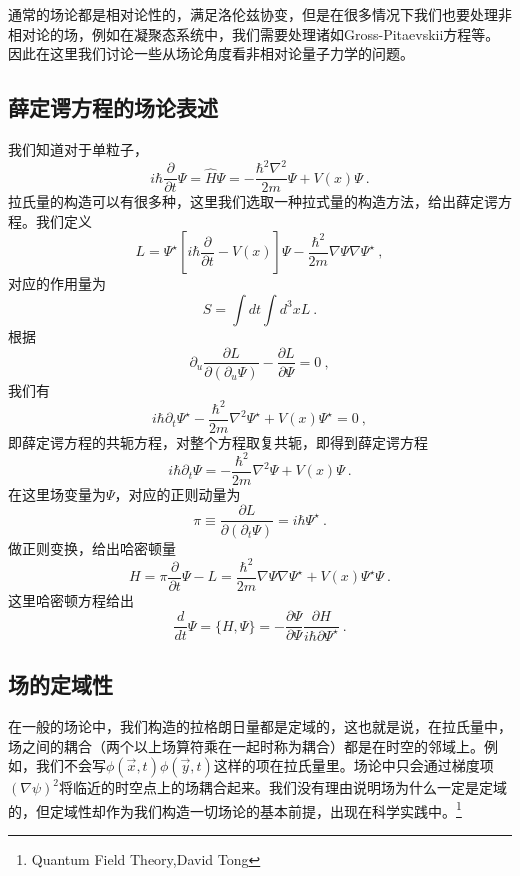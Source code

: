 
\begin{issues}
\issueDraft
\end{issues}

通常的场论都是相对论性的，满足洛伦兹协变，但是在很多情况下我们也要处理非相对论的场，例如在凝聚态系统中，我们需要处理诸如Gross-Pitaevskii方程等。因此在这里我们讨论一些从场论角度看非相对论量子力学的问题。
\subsection{薛定谔方程的场论表述}
我们知道对于单粒子，
\begin{equation}
i\hbar \frac{\partial}{\partial t} \Psi = \hat{H} \Psi = -\frac{\hbar^2 \nabla^2}{2m} \Psi + V(x)\Psi ~.
\end{equation}
拉氏量的构造可以有很多种，这里我们选取一种拉式量的构造方法，给出薛定谔方程。我们定义
$$
L =  \Psi^\star [i\hbar \frac{\partial}{\partial t}  - V(x)]\Psi - \frac{\hbar^2}{2m}\nabla \Psi \nabla \Psi^\star~,
$$
对应的作用量为
$$
S = \int dt \int d^3 x L~.
$$
根据
$$
\partial_u \frac{\partial L}{\partial (\partial_u \Psi)} - \frac{\partial L}{\partial \Psi}=0 ~,
$$
我们有
$$
i\hbar \partial_t \Psi^\star - \frac{\hbar^2}{2m}\nabla^2 \Psi^\star + V(x)\Psi^\star=0 ~,
$$
即薛定谔方程的共轭方程，对整个方程取复共轭，即得到薛定谔方程
$$
i\hbar \partial_t \Psi = -\frac{\hbar^2}{2m}\nabla^2 \Psi + V(x)\Psi ~.
$$
在这里场变量为$\Psi$，对应的正则动量为
$$
\pi \equiv \frac{\partial L}{\partial (\partial_t \Psi)} = i\hbar \Psi^\star~.
$$
做正则变换，给出哈密顿量
$$
H = \pi \frac{\partial}{\partial t}\Psi - L =  \frac{\hbar^2}{2m} \nabla\Psi \nabla \Psi^\star+ V(x)\Psi^\star\Psi~.
$$
这里哈密顿方程给出
$$
\frac{d}{d t}\Psi = \{H,\Psi\} = -\frac{\partial \Psi}{\partial \Psi}\frac{\partial H}{i\hbar \partial \Psi^\star}~.
$$
\subsection{场的定域性}
在一般的场论中，我们构造的拉格朗日量都是定域的，这也就是说，在拉氏量中，场之间的耦合（两个以上场算符乘在一起时称为耦合）都是在时空的邻域上。例如，我们不会写$\phi(\vec{x},t)\phi(\vec{y},t)$这样的项在拉氏量里。场论中只会通过梯度项$(\nabla \psi)^2$将临近的时空点上的场耦合起来。我们没有理由说明场为什么一定是定域的，但定域性却作为我们构造一切场论的基本前提，出现在科学实践中。\footnote{Quantum Field Theory,David Tong}